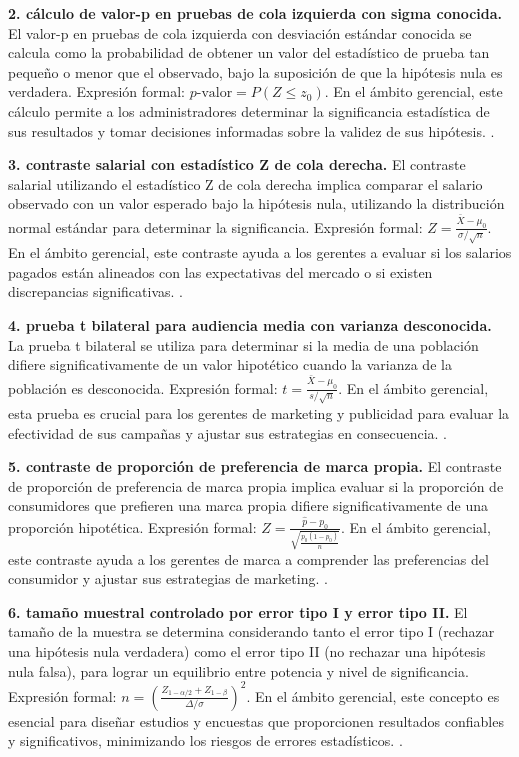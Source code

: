 {\textbf{2. cálculo de valor-p en pruebas de cola izquierda con sigma conocida.} El valor-p en pruebas de cola izquierda con desviación estándar conocida se calcula como la probabilidad de obtener un valor del estadístico de prueba tan pequeño o menor que el observado, bajo la suposición de que la hipótesis nula es verdadera. Expresión formal: $p\text{-valor} = P(Z \leq z_0)$. En el ámbito gerencial, este cálculo permite a los administradores determinar la significancia estadística de sus resultados y tomar decisiones informadas sobre la validez de sus hipótesis. \citep{anderson2012,lind2012,wackerly2010}.

\textbf{3. contraste salarial con estadístico Z de cola derecha.} El contraste salarial utilizando el estadístico Z de cola derecha implica comparar el salario observado con un valor esperado bajo la hipótesis nula, utilizando la distribución normal estándar para determinar la significancia. Expresión formal: $Z = \frac{\bar{X} - \mu_0}{\sigma / \sqrt{n}}$. En el ámbito gerencial, este contraste ayuda a los gerentes a evaluar si los salarios pagados están alineados con las expectativas del mercado o si existen discrepancias significativas. \citep{anderson2012,lind2012,wackerly2010}.

\textbf{4. prueba t bilateral para audiencia media con varianza desconocida.} La prueba t bilateral se utiliza para determinar si la media de una población difiere significativamente de un valor hipotético cuando la varianza de la población es desconocida. Expresión formal: $t = \frac{\bar{X} - \mu_0}{s / \sqrt{n}}$. En el ámbito gerencial, esta prueba es crucial para los gerentes de marketing y publicidad para evaluar la efectividad de sus campañas y ajustar sus estrategias en consecuencia. \citep{anderson2012,lind2012,wackerly2010}.

\textbf{5. contraste de proporción de preferencia de marca propia.} El contraste de proporción de preferencia de marca propia implica evaluar si la proporción de consumidores que prefieren una marca propia difiere significativamente de una proporción hipotética. Expresión formal: $Z = \frac{\hat{p} - p_0}{\sqrt{\frac{p_0(1 - p_0)}{n}}}$. En el ámbito gerencial, este contraste ayuda a los gerentes de marca a comprender las preferencias del consumidor y ajustar sus estrategias de marketing. \citep{anderson2012,lind2012,wackerly2010}.

\textbf{6. tamaño muestral controlado por error tipo I y error tipo II.} El tamaño de la muestra se determina considerando tanto el error tipo I (rechazar una hipótesis nula verdadera) como el error tipo II (no rechazar una hipótesis nula falsa), para lograr un equilibrio entre potencia y nivel de significancia. Expresión formal: $n = \left( \frac{Z_{1-\alpha/2} + Z_{1-\beta}}{\Delta / \sigma} \right)^2$. En el ámbito gerencial, este concepto es esencial para diseñar estudios y encuestas que proporcionen resultados confiables y significativos, minimizando los riesgos de errores estadísticos. \citep{anderson2012,lind2012,wackerly2010}.

}
